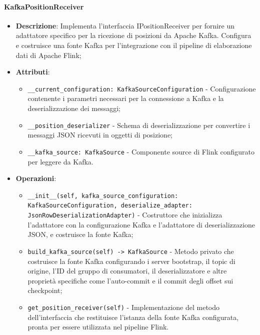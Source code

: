 \documentclass[10pt]{article}
\begin{document}
    \paragraph{KafkaPositionReceiver}
    \begin{itemize} 
    \item \textbf{Descrizione}: Implementa l'interfaccia IPositionReceiver per fornire un adattatore specifico per la ricezione di posizioni da Apache Kafka. Configura e costruisce una fonte Kafka per l'integrazione con il pipeline di elaborazione dati di Apache Flink;
    \item \textbf{Attributi}:
    \begin{itemize}
        \item \texttt{\_\_current\_configuration: KafkaSourceConfiguration} - Configurazione contenente i parametri necessari per la connessione a Kafka e la deserializzazione dei messaggi;
        \item \texttt{\_\_position\_deserializer} - Schema di deserializzazione per convertire i messaggi JSON ricevuti in oggetti di posizione;
        \item \texttt{\_\_kafka\_source: KafkaSource} - Componente source di Flink configurato per leggere da Kafka.
    \end{itemize}
    
    \item \textbf{Operazioni}:
    \begin{itemize}
        \item \texttt{\_\_init\_\_(self, kafka\_source\_configuration: KafkaSourceConfiguration, deserialize\_adapter: JsonRowDeserializationAdapter)} - Costruttore che inizializza l'adattatore con la configurazione Kafka e l'adattatore di deserializzazione JSON, e costruisce la fonte Kafka;
        
        \item \texttt{build\_kafka\_source(self) -> KafkaSource} - Metodo privato che costruisce la fonte Kafka configurando i server bootstrap, il topic di origine, l'ID del gruppo di consumatori, il deserializzatore e altre proprietà specifiche come l'auto-commit e il commit degli offset sui checkpoint;
        
        \item \texttt{get\_position\_receiver(self)} - Implementazione del metodo dell'interfaccia che restituisce l'istanza della fonte Kafka configurata, pronta per essere utilizzata nel pipeline Flink.
    \end{itemize}
    \end{itemize}
\end{document}
